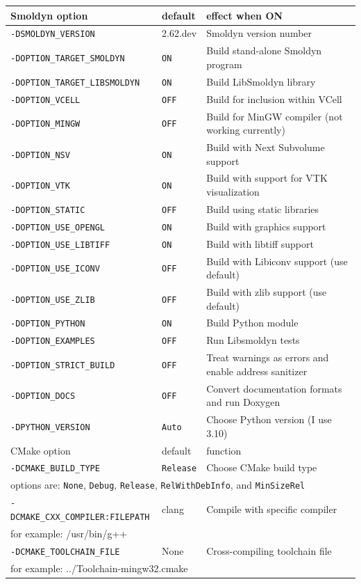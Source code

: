 \documentclass {scrbook}
\newcommand {\ttt} {\texttt}
\begin{document}
\begin{longtable}[c]{lll}
Smoldyn option & default & effect when ON\\
\hline
\ttt{-DSMOLDYN\_VERSION} & 2.62.dev & Smoldyn version number\\
\ttt{-DOPTION\_TARGET\_SMOLDYN} & \ttt{ON} & Build stand-alone Smoldyn program\\
\ttt{-DOPTION\_TARGET\_LIBSMOLDYN} & \ttt{ON} & Build LibSmoldyn library\\
\ttt{-DOPTION\_VCELL} & \ttt{OFF} & Build for inclusion within VCell\\
\ttt{-DOPTION\_MINGW} & \ttt{OFF} & Build for MinGW compiler (not working currently)\\
\ttt{-DOPTION\_NSV} & \ttt{ON} & Build with Next Subvolume support\\
\ttt{-DOPTION\_VTK} & \ttt{ON} & Build with support for VTK visualization\\
\ttt{-DOPTION\_STATIC} & \ttt{OFF} & Build using static libraries\\
\ttt{-DOPTION\_USE\_OPENGL} & \ttt{ON} & Build with graphics support\\
\ttt{-DOPTION\_USE\_LIBTIFF} & \ttt{ON} & Build with libtiff support\\
\ttt{-DOPTION\_USE\_ICONV} & \ttt{OFF} & Build with Libiconv support (use default)\\
\ttt{-DOPTION\_USE\_ZLIB} & \ttt{OFF} & Build with zlib support (use default)\\
\ttt{-DOPTION\_PYTHON} & \ttt{ON} & Build Python module\\
\ttt{-DOPTION\_EXAMPLES} & \ttt{OFF} & Run Libsmoldyn tests\\
\ttt{-DOPTION\_STRICT\_BUILD} & \ttt{OFF} & Treat warnings as errors and enable address sanitizer\\
\ttt{-DOPTION\_DOCS} & \ttt{OFF} & Convert documentation formats and run Doxygen\\
\ttt{-DPYTHON\_VERSION} & \ttt{Auto} & Choose Python version (I use 3.10)\\
\hline
CMake option & default & function\\
\hline
\ttt{-DCMAKE\_BUILD\_TYPE} & \ttt{Release} & Choose CMake build type\\
\multicolumn{3}{l}{\hspace{0.3in}options are: \ttt{None}, \ttt{Debug}, \ttt{Release}, \ttt{RelWithDebInfo}, and \ttt{MinSizeRel}}\\
\ttt{-DCMAKE\_CXX\_COMPILER:FILEPATH} & clang & Compile with specific compiler\\
\multicolumn{3}{l}{\hspace{0.3in}for example: /usr/bin/g++}\\
\ttt{-DCMAKE\_TOOLCHAIN\_FILE} & None & Cross-compiling toolchain file \\
\multicolumn{3}{l}{\hspace{0.3in}for example: ../Toolchain-mingw32.cmake}\\
\end{longtable}
\end{document}

